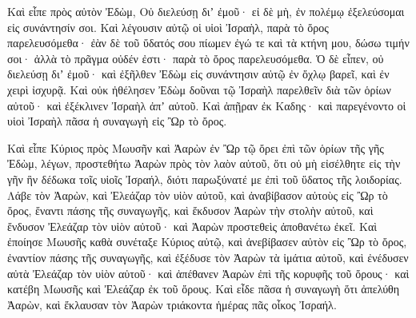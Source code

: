 {Καὶ εἶπε πρὸς αὐτὸν Ἐδὼμ, Οὐ διελεύσῃ διʼ ἐμοῦ· εἰ δὲ μὴ, ἐν πολέμῳ ἐξελεύσομαι εἰς συνάντησίν σοι.
Καὶ λέγουσιν αὐτῷ οἱ υἱοὶ Ἰσραὴλ, παρὰ τὸ ὄρος παρελευσόμεθα· ἐὰν δὲ τοῦ ὕδατός σου πίωμεν ἐγώ τε καὶ τὰ κτήνη μου, δώσω τιμήν σοι· ἀλλὰ τὸ πρᾶγμα οὐδέν ἐστι· παρὰ τὸ ὄρος παρελευσόμεθα.
Ὁ δὲ εἶπεν, οὐ διελεύσῃ διʼ ἐμοῦ· καὶ ἐξῆλθεν Ἐδὼμ εἰς συνάντησιν αὐτῷ ἐν ὄχλῳ βαρεῖ, καὶ ἐν χειρὶ ἰσχυρᾷ.
Καὶ οὐκ ἠθέλησεν Ἐδὼμ δοῦναι τῷ Ἰσραὴλ παρελθεῖν διὰ τῶν ὁρίων αὐτοῦ· καὶ ἐξέκλινεν Ἰσραὴλ ἀπʼ αὐτοῦ.
Καὶ ἀπῇραν ἐκ Καδης· καὶ παρεγένοντο οἱ υἱοὶ Ἰσραὴλ πᾶσα ἡ συναγωγὴ εἰς Ὢρ τὸ ὄρος.
\par }{\PP {}Καὶ εἶπε Κύριος πρὸς Μωυσῆν καὶ Ἀαρὼν ἐν Ὢρ τῷ ὄρει ἐπὶ τῶν ὁρίων τῆς γῆς Ἐδὼμ, λέγων,
προστεθήτω Ἀαρὼν πρὸς τὸν λαὸν αὐτοῦ, ὅτι οὐ μὴ εἰσέλθητε εἰς τὴν γῆν ἣν δέδωκα τοῖς υἱοῖς Ἰσραήλ, διότι παρωξύνατέ με ἐπὶ τοῦ ὕδατος τῆς λοιδορίας.
Λάβε τὸν Ἀαρὼν, καὶ Ἐλεάζαρ τὸν υἱὸν αὐτοῦ, καὶ ἀναβίβασον αὐτοὺς εἰς Ὢρ τὸ ὄρος, ἔναντι πάσης τῆς συναγωγῆς,
καὶ ἔκδυσον Ἀαρὼν τὴν στολὴν αὐτοῦ, καὶ ἔνδυσον Ἐλεάζαρ τὸν υἱὸν αὐτοῦ· καὶ Ἀαρὼν προστεθεὶς ἀποθανέτω ἐκεῖ.
Καὶ ἐποίησε Μωυσῆς καθὰ συνέταξε Κύριος αὐτῷ, καὶ ἀνεβίβασεν αὐτὸν εἰς Ὢρ τὸ ὄρος, ἐναντίον πάσης τῆς συναγωγῆς,
καὶ ἐξέδυσε τὸν Ἀαρὼν τὰ ἱμάτια αὐτοῦ, καὶ ἐνέδυσεν αὐτὰ Ἐλεάζαρ τὸν υἱὸν αὐτοῦ· καὶ ἀπέθανεν Ἀαρὼν ἐπὶ τῆς κορυφῆς τοῦ ὄρους· καὶ κατέβη Μωυσῆς καὶ Ἐλεάζαρ ἐκ τοῦ ὄρους.
Καὶ εἶδε πᾶσα ἡ συναγωγὴ ὅτι ἀπελύθη Ἀαρὼν, καὶ ἔκλαυσαν τὸν Ἀαρὼν τριάκοντα ἡμέρας πᾶς οἶκος Ἰσραήλ.

}
